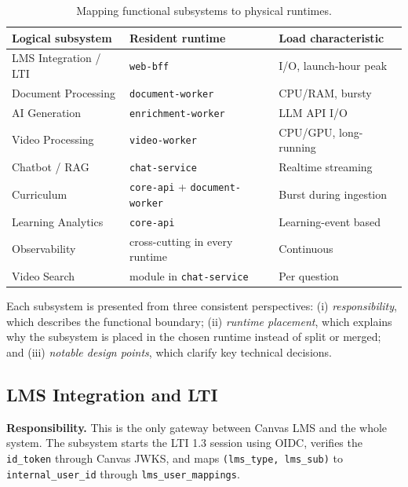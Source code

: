 \begin{table}[H]
    \centering
    \caption{Mapping functional subsystems to physical runtimes.}
    \label{tab:service-to-runtime}
    \begin{tabular}{|p{4.5cm}|p{5cm}|p{4cm}|}
        \hline
        \textbf{Logical subsystem} & \textbf{Resident runtime} & \textbf{Load characteristic} \\
        \hline
        LMS Integration / LTI & \texttt{web-bff} & I/O, launch-hour peak \\
        \hline
        Document Processing & \texttt{document-worker} & CPU/RAM, bursty \\
        \hline
        AI Generation & \texttt{enrichment-worker} & LLM API I/O \\
        \hline
        Video Processing & \texttt{video-worker} & CPU/GPU, long-running \\
        \hline
        Chatbot / RAG & \texttt{chat-service} & Realtime streaming \\
        \hline
        Curriculum & \texttt{core-api} + \texttt{document-worker} & Burst during ingestion \\
        \hline
        Learning Analytics & \texttt{core-api} & Learning-event based \\
        \hline
        Observability & cross-cutting in every runtime & Continuous \\
        \hline
        Video Search & module in \texttt{chat-service} & Per question \\
        \hline
    \end{tabular}
\end{table}

Each subsystem is presented from three consistent perspectives:
(i) \textit{responsibility}, which describes the functional boundary;
(ii) \textit{runtime placement}, which explains why the subsystem is
placed in the chosen runtime instead of split or merged; and
(iii) \textit{notable design points}, which clarify key technical
decisions.

\subsection{LMS Integration and LTI}

\textbf{Responsibility.} This is the only gateway between Canvas LMS and
the whole system. The subsystem starts the LTI 1.3 session using OIDC,
verifies the \texttt{id\_token} through Canvas JWKS, and maps
\texttt{(lms\_type, lms\_sub)} to \texttt{internal\_user\_id} through
\texttt{lms\_user\_mappings}.

